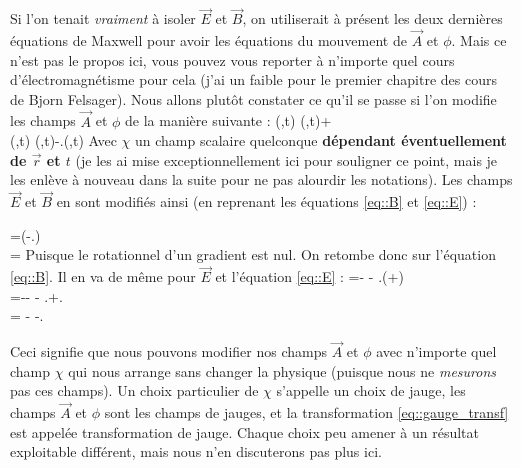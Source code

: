 Si l'on tenait \textit{vraiment} à isoler $\Vec{E}$ et $\Vec{B}$, on utiliserait à présent les deux dernières équations de Maxwell pour avoir les équations du mouvement de $\Vec{A}$ et $\phi$. Mais ce n'est pas le propos ici, vous pouvez vous reporter à n'importe quel cours d'électromagnétisme pour cela (j'ai un faible pour le premier chapitre des cours de Bjorn Felsager\cite{Felsager}). Nous allons plutôt constater ce qu'il se passe si l'on modifie les champs $\Vec{A}$ et $\phi$ de la manière suivante : 
\beq \label{eq::gauge_transf}
    \phi(,t) \rightarrow \phi(,t)+\\
    (,t) \rightarrow {}(,t)-\Vec{\nabla}.\chi(,t)
\eeq
Avec $\chi$ un champ scalaire quelconque \textbf{dépendant éventuellement de $\Vec{r}$ et $t$} (je les ai mise exceptionnellement ici pour souligner ce point, mais je les enlève à nouveau dans la suite pour ne pas alourdir les notations). Les champs $\Vec{E}$ et $\Vec{B}$ en sont modifiés ainsi (en reprenant les équations \eqref{eq::B} et \eqref{eq::E}) :

\beq 
    =\Vec{\nabla}\times\left(-\Vec{\nabla}.\chi\right) \nonumber \\
    \Rightarrow {}=\Vec{\nabla}\times{}
\eeq 
Puisque le rotationnel d'un gradient est nul. On retombe donc sur l'équation \eqref{eq::B}. Il en va de même pour $\Vec{E}$ et l'équation \eqref{eq::E} :
\beq
    =- - \Vec{\nabla}.\left(\phi+\right) \nonumber \\
    \Rightarrow {}=-- - \Vec{\nabla}.\phi+\Vec{\nabla}. \nonumber \\
    \Rightarrow {} = - -\Vec{\nabla}.\phi
\eeq

Ceci signifie que nous pouvons modifier nos champs $\Vec{A}$ et $\phi$ avec n'importe quel champ $\chi$ qui nous arrange sans changer la physique (puisque nous ne \textit{mesurons} pas ces champs). Un choix particulier de $\chi$ s'appelle un choix de jauge, les champs $\Vec{A}$ et $\phi$ sont les champs de jauges, et la transformation \eqref{eq::gauge_transf} est appelée transformation de jauge. Chaque choix peu amener à un résultat exploitable différent, mais nous n'en discuterons pas plus ici.

